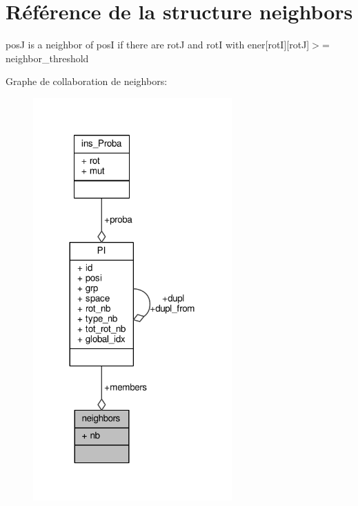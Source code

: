\hypertarget{structneighbors}{\section{Référence de la structure neighbors}
\label{structneighbors}
}


pos\+J is a neighbor of pos\+I if there are rot\+J and rot\+I with ener\mbox{[}rot\+I\mbox{]}\mbox{[}rot\+J\mbox{]}$>$= neighbor\+\_\+threshold  




Graphe de collaboration de neighbors\+:\nopagebreak
\begin{figure}[H]
\begin{center}
\leavevmode
\includegraphics[width=216pt]{structneighbors__coll__graph}
\end{center}
\end{figure}
